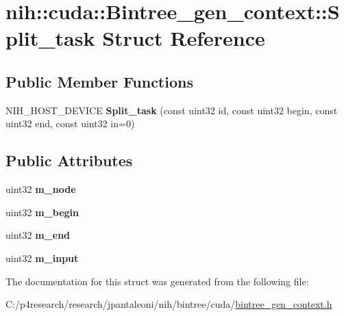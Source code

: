 \hypertarget{structnih_1_1cuda_1_1_bintree__gen__context_1_1_split__task}{
\section{nih\-:\-:cuda\-:\-:\-Bintree\-\_\-gen\-\_\-context\-:\-:\-Split\-\_\-task \-Struct \-Reference}
\label{structnih_1_1cuda_1_1_bintree__gen__context_1_1_split__task}
}
\subsection*{\-Public \-Member \-Functions}
\begin{DoxyCompactItemize}
\item 
\hypertarget{structnih_1_1cuda_1_1_bintree__gen__context_1_1_split__task_ae1c560c306c8158bbb2e371354417034}{
\-N\-I\-H\-\_\-\-H\-O\-S\-T\-\_\-\-D\-E\-V\-I\-C\-E {\bfseries \-Split\-\_\-task} (const uint32 id, const uint32 begin, const uint32 end, const uint32 in=0)}
\label{structnih_1_1cuda_1_1_bintree__gen__context_1_1_split__task_ae1c560c306c8158bbb2e371354417034}

\end{DoxyCompactItemize}
\subsection*{\-Public \-Attributes}
\begin{DoxyCompactItemize}
\item 
\hypertarget{structnih_1_1cuda_1_1_bintree__gen__context_1_1_split__task_a2357bac8f475edfffc62571f31666d15}{
uint32 {\bfseries m\-\_\-node}}
\label{structnih_1_1cuda_1_1_bintree__gen__context_1_1_split__task_a2357bac8f475edfffc62571f31666d15}

\item 
\hypertarget{structnih_1_1cuda_1_1_bintree__gen__context_1_1_split__task_abfdacc18d9e093ef6ad8f098d067ffbd}{
uint32 {\bfseries m\-\_\-begin}}
\label{structnih_1_1cuda_1_1_bintree__gen__context_1_1_split__task_abfdacc18d9e093ef6ad8f098d067ffbd}

\item 
\hypertarget{structnih_1_1cuda_1_1_bintree__gen__context_1_1_split__task_a6c2372d43f79d1567c1a4f8150020f3e}{
uint32 {\bfseries m\-\_\-end}}
\label{structnih_1_1cuda_1_1_bintree__gen__context_1_1_split__task_a6c2372d43f79d1567c1a4f8150020f3e}

\item 
\hypertarget{structnih_1_1cuda_1_1_bintree__gen__context_1_1_split__task_a0bff2664bfb2b7cc00aafb9bea7f4a18}{
uint32 {\bfseries m\-\_\-input}}
\label{structnih_1_1cuda_1_1_bintree__gen__context_1_1_split__task_a0bff2664bfb2b7cc00aafb9bea7f4a18}

\end{DoxyCompactItemize}


\-The documentation for this struct was generated from the following file\-:\begin{DoxyCompactItemize}
\item 
\-C\-:/p4research/research/jpantaleoni/nih/bintree/cuda/\hyperlink{bintree__gen__context_8h}{bintree\-\_\-gen\-\_\-context.\-h}\end{DoxyCompactItemize}
